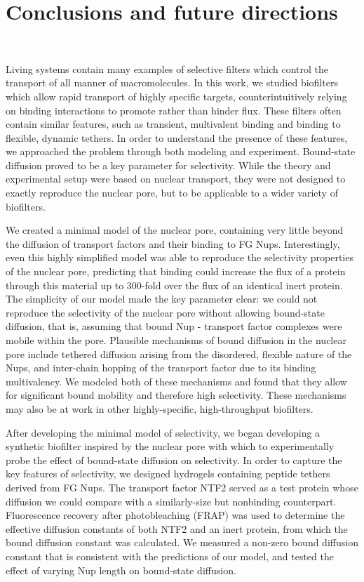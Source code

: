\chapter{Conclusions and future directions}~\label{ch06_conclusions}

Living systems contain many examples of selective filters which control the transport of all manner of macromolecules.  In this work, we studied biofilters which allow rapid transport of highly specific targets, counterintuitively relying on binding interactions to promote rather than hinder flux.  These filters often contain similar features, such as transient, multivalent binding and binding to flexible, dynamic tethers.  In order to understand the presence of these features, we approached the problem through both modeling and experiment.  Bound-state diffusion proved to be a key parameter for selectivity.  While the theory and experimental setup were based on nuclear transport, they were not designed to exactly reproduce the nuclear pore, but to be applicable to a wider variety of biofilters.

We created a minimal model of the nuclear pore, containing very little beyond the diffusion of transport factors and their binding to FG Nups.  Interestingly, even this highly simplified model was able to reproduce the selectivity properties of the nuclear pore, predicting that binding could increase the flux of a protein through this material up to 300-fold over the flux of an identical inert protein.  The simplicity of our model made the key parameter clear: we could not reproduce the selectivity of the nuclear pore without allowing bound-state diffusion, that is, assuming that bound Nup - transport factor complexes were mobile within the pore.  Plausible mechanisms of bound diffusion in the nuclear pore include tethered diffusion arising from the disordered, flexible nature of the Nups, and inter-chain hopping of the transport factor due to its binding multivalency.  We modeled both of these mechanisms and found that they allow for significant bound mobility and therefore high selectivity.  These mechanisms may also be at work in other highly-specific, high-throughput biofilters.

After developing the minimal model of selectivity, we began developing a synthetic biofilter inspired by the nuclear pore with which to experimentally probe the effect of bound-state diffusion  on selectivity.  In order to capture the key features of selectivity, we designed hydrogels containing peptide tethers derived from FG Nups.  The transport factor NTF2 served as a test protein whose diffusion we could compare with a similarly-size but nonbinding counterpart.  Fluorescence recovery after photobleaching (FRAP) was used to determine the effective diffusion constants of both NTF2 and an inert protein, from which the bound diffusion constant was calculated. We measured a non-zero bound diffusion constant that is consistent with the predictions of our model, and tested the effect of varying Nup length on bound-state diffusion.

